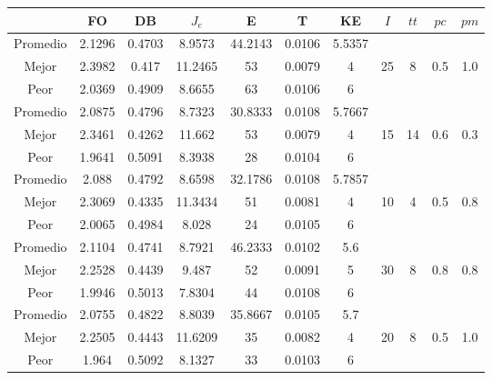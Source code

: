 \begin{table}[h!]
    \footnotesize
    \begin{center}
        \begin{tabular}{|c|c|c|c|c|c|c|c|c|c|c|}
        \hline
             & {\bf FO} & {\bf DB} & $J_e$ & {\bf E} & {\bf T} & {\bf KE} & $I$ & $tt$ & $pc$ & $pm$ \\
        \hline
        \hline
            Promedio  & 2.1296 & 0.4703 & 8.9573 & 44.2143 & 0.0106 & 5.5357 &  &  &  & \\
            \cline{1-7}
            Mejor & 2.3982 & 0.417  & 11.2465 & 53 & 0.0079 & 4 & 25 & 8 & 0.5 & 1.0\\
            \cline{1-7}
            Peor & 2.0369 & 0.4909  & 8.6655 & 63 & 0.0106 & 6 &  &  &  & \\
        \hline
        \hline
            Promedio  & 2.0875 & 0.4796 & 8.7323 & 30.8333 & 0.0108 & 5.7667 &  &  &  & \\
            \cline{1-7}
            Mejor & 2.3461 & 0.4262  & 11.662 & 53 & 0.0079 & 4 & 15 & 14 & 0.6 & 0.3\\
            \cline{1-7}
            Peor & 1.9641 & 0.5091  & 8.3938 & 28 & 0.0104 & 6 &  &  &  & \\
        \hline
        \hline
            Promedio  & 2.088 & 0.4792 & 8.6598 & 32.1786 & 0.0108 & 5.7857 &  &  &  & \\
            \cline{1-7}
            Mejor & 2.3069 & 0.4335  & 11.3434 & 51 & 0.0081 & 4 & 10 & 4 & 0.5 & 0.8\\
            \cline{1-7}
            Peor & 2.0065 & 0.4984  & 8.028 & 24 & 0.0105 & 6 &  &  &  & \\
        \hline
        \hline
            Promedio  & 2.1104 & 0.4741 & 8.7921 & 46.2333 & 0.0102 & 5.6 &  &  &  & \\
            \cline{1-7}
            Mejor & 2.2528 & 0.4439  & 9.487 & 52 & 0.0091 & 5 & 30 & 8 & 0.8 & 0.8\\
            \cline{1-7}
            Peor & 1.9946 & 0.5013  & 7.8304 & 44 & 0.0108 & 6 &  &  &  & \\
        \hline
        \hline
            Promedio  & 2.0755 & 0.4822 & 8.8039 & 35.8667 & 0.0105 & 5.7 &  &  &  & \\
            \cline{1-7}
            Mejor & 2.2505 & 0.4443  & 11.6209 & 35 & 0.0082 & 4 & 20 & 8 & 0.5 & 1.0\\
            \cline{1-7}
            Peor & 1.964 & 0.5092  & 8.1327 & 33 & 0.0103 & 6 &  &  &  & \\

\end{tabular}
\end{center}
\end{table}
